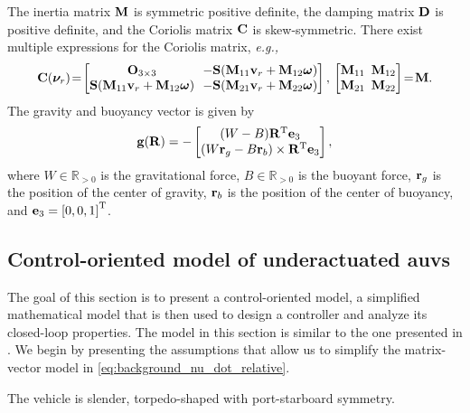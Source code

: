 The inertia matrix $\mathbf{M}$ is symmetric positive definite, the damping matrix $\mathbf{D}$ is positive definite, and the Coriolis matrix $\mathbf{C}$ is skew-symmetric.
There exist multiple expressions for the Coriolis matrix, \emph{e.g.,}
\begin{equation}
    \label{eq:background_coriolis}
    \mat{C}(\bs{\nu}_r)\! =\!
    \begin{bmatrix}
        \mat{O}_{3 \times 3} & \!\!-\mat{S}(\mat{M}_{11}\mat{v}_r + \mat{M}_{12}\bs{\omega}) \\
        \mat{S}(\mat{M}_{11}\mat{v}_r + \mat{M}_{12}\bs{\omega}) & \!\!-\mat{S}(\mat{M}_{21}\mat{v}_r + \mat{M}_{22}\bs{\omega})
    \end{bmatrix}, \,
    \begin{bmatrix}
        \mat{M}_{11} & \!\!\!\mat{M}_{12} \\ \mat{M}_{21} & \!\!\!\mat{M}_{22}
    \end{bmatrix}\!
    = \!\mat{M}.
\end{equation}
The gravity and buoyancy vector is given by \cite{fossen_handbook_2011}
\begin{equation}
    \mathbf{g}(\mathbf{R}) = -
    \begin{bmatrix}
        (W - B) \mathbf{R}^{\mathrm{T}} \mathbf{e}_3 \\
        (W\mathbf{r}_g - B\mathbf{r}_b) \times \mathbf{R}^{\mathrm{T}} \mathbf{e}_3
    \end{bmatrix},
\end{equation}
where $W \in \mathbb{R}_{> 0}$ is the gravitational force, $B \in \mathbb{R}_{> 0}$ is the buoyant force, $\mathbf{r}_g$ is the position of the center of gravity, $\mathbf{r}_b$ is the position of the center of buoyancy, and $\mathbf{e}_3 = \left[0, 0, 1\right]^{\mathrm{T}}$.

\subsection{Control-oriented model of underactuated \glspl{auv}}
\label{sec:model_control_oriented}
The goal of this section is to present a control-oriented model, a simplified mathematical model that is then used to design a controller and analyze its closed-loop properties.
The model in this section is similar to the one presented in \cite{borhaug_straight_2007}.
We begin by presenting the assumptions that allow us to simplify the matrix-vector model in \eqref{eq:background_nu_dot_relative}.

\begin{asm}
    \label{asm:symmetric}
    The vehicle is slender, torpedo-shaped with port-starboard symmetry.
\end{asm}

